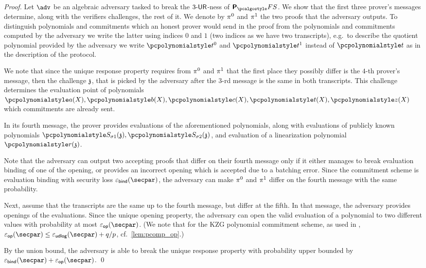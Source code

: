 \begin{proof}
	Let $\adv$ be an algebraic adversary tasked to break the ${3\text{-}\mathsf{UR}}$-ness of
	$\plonkprotfs$. We show that the first three prover's messages determine, along with 	the verifiers challenges, the rest of it. We denote by $\pi^0$ and $\pi^1$ the two proofs that the adversary outputs. To distinguish polynomials and commitments which an honest prover would send in the proof from the polynomials and commitments computed by the adversary we write the latter using indices $0$ and $1$ (two indices as we have two transcripts), e.g.~to describe the quotient polynomial provided by the adversary we write $\p{t}^0$ and $\p{t}^1$ instead of $\p{t}$ as in the description of the protocol.
	
	We note that since the unique response property requires from $\pi^{0}$ and $\pi^{1}$ that the first place they possibly differ is the $4$-th prover's message, then the challenge $\mathfrak{z}$, that is picked by the adversary after the $3$-rd message is the same in both transcripts. This challenge determines the evaluation point of polynomials $\p{a}(X), \p{b}(X), \p{c}(X), \p{t}(X), \p{z}(X)$ which commitments are already sent.
	
	In its fourth message, the prover provides evaluations of the aforementioned polynomials, along with evaluations of publicly known polynomials $
	\p{S_{\sigma 1}} (\chz), \p{S_{\sigma 2}} (\chz)$, and evaluation of a linearization polynomial $\p{r}(\chz)$.
	
	Note that the adversary can output two accepting proofs that differ on their fourth message only if it either manages to break evaluation binding of one of the opening, or provides an incorrect opening which is accepted due to a batching error. Since the commitment scheme is evaluation binding with security loss $\epsbinding (\secpar)$, %
	the adversary can make $\pi^{0}$ and $\pi^{1}$ differ on the fourth message with the same probability. %
	
	Next, assume that the transcripts are the same up to the fourth message, but differ at the fifth. In that message, the adversary provides openings of the evaluations. Since the unique opening property, the adversary can open the valid evaluation of a polynomial to two different values with probability at most $\epsop (\secpar)$. (We note that for the KZG polynomial commitment scheme, as used in \cite{EPRINT:GabWilCio19}, $\epsop (\secpar) \leq \epsudlog (\secpar) + \infrac{q}{p}$, cf.~\cref{lem:pcomp_op}.)
	
	By the union bound, the adversary is able to break the unique response property with probability upper bounded by $\epsbinding (\secpar) + \epsop (\secpar)$.
	\qed
\end{proof}


